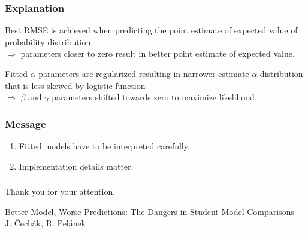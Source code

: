 \documentclass[bigger, aspectratio=169]{beamer}
\begin{document}
\begin{frame}
	\frametitle{Explanation}	
	Best RMSE is achieved when predicting the point estimate of expected value of probability distribution 
	\\
	$\Rightarrow$ parameters closer to zero result in better point estimate of expected value.
	
	Fitted $\alpha$ parameters are regularized resulting in narrower estimate $\alpha$ distribution that is 
	less skewed by logistic function \\
	$\Rightarrow$ $\beta$ and $\gamma$ parameters shifted towards zero to maximize likelihood.
\end{frame}

\begin{frame}
\frametitle{Message}
\begin{enumerate}
\item Fitted models have to be interpreted carefully.
\bigskip
\item Implementation details matter. 
\end{enumerate}
\end{frame}

\begin{frame}[standout]
	\frametitle{}
	\begin{center}
		Thank you for your attention.
	\end{center}
	\vfill
	{
		\raggedright
		\footnotesize
		Better Model, Worse Predictions: The Dangers in Student Model Comparisons\\
		J. Čechák, R. Pelánek
		
	}

\end{frame}
\end{document}
